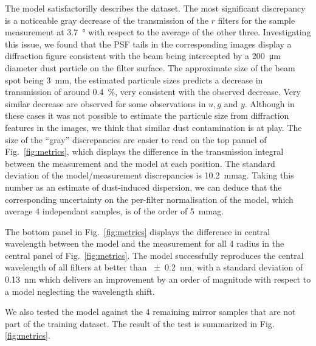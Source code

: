The model satisfactorilly describes the dataset. The most significant
discrepancy is a noticeable gray decrease of the transmission of the
$r$ filters for the sample measurement at \SI{3.7}{\degree} with
respect to the average of the other three. Investigating this issue,
we found that the PSF tails in the corresponding images display a
diffraction figure consistent with the beam being intercepted by a
\SI{200}{\micro\meter} diameter dust particle on the filter
surface. The approximate size of the beam spot being \SI{3}{mm}, the
estimated particule sizes predicts a decrease in transmission of
around \SI{0.4}{\percent}, very consistent with the observed
decrease. Very similar decrease are observed for some observations in
$u,g$ and $y$. Although in these cases it was not possible to estimate
the particule size from diffraction features in the images, we think
that similar dust contamination is at play. The size of the ``gray''
discrepancies are easier to read on the top pannel of
Fig.~\ref{fig:metrics}, which displays the difference in the
transmission integral between the measurement and the model at each
position. The standard deviation of the model/measurement
discrepancies is \SI{10.2}{mmag}. Taking this number as an estimate of
dust-induced dispersion, we can deduce that the corresponding
uncertainty on the per-filter normalisation of the model, which
average 4 independant samples, is of the order of \SI{5}{mmag}.

The bottom panel in Fig.~\ref{fig:metrics} displays the difference in
central wavelength between the model and the measurement for all 4
radius in the central panel of Fig.~\ref{fig:metrics}. The model
successfully reproduces the central wavelength of all filters at
better than \SI{\pm 0.2}{nm}, with a standard deviation of \SI{0.13}{nm}
which delivers an improvement by an order of magnitude with respect to
a model neglecting the wavelength shift.


We also tested the model against the 4 remaining mirror samples that
are not part of the training dataset. The result of the test is
summarized in Fig.\ref{fig:metrics}.

